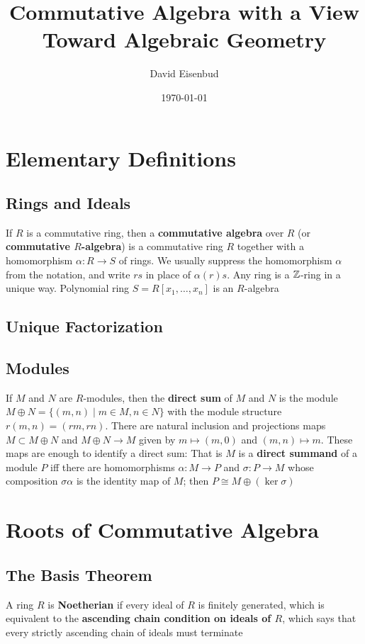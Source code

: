 \documentclass[11pt]{article}
\author{David Eisenbud}
\date{\today}
\title{Commutative Algebra with a View Toward Algebraic Geometry}
\begin{document}
\maketitle
\tableofcontents

\section{Elementary Definitions}
\label{sec:orgfbc8f1d}
\subsection{Rings and Ideals}
\label{sec:org9f207fe}
If \(R\) is a commutative ring, then a \textbf{commutative algebra} over \(R\) (or
\textbf{commutative \(R\)-algebra}) is a commutative ring \(R\) together with a
homomorphism \(\alpha:R\to S\) of rings. We usually suppress the homomorphism \(\alpha\)
from the notation, and write \(rs\) in place of \(\alpha(r)s\). Any ring is a
\(\mathbb{Z}\)-ring in a unique way. Polynomial ring \(S=R[x_1,\dots,x_n]\) is an \(R\)-algebra
\subsection{Unique Factorization}
\label{sec:orge49c9ca}
\subsection{Modules}
\label{sec:org9461403}
If \(M\) and \(N\) are \(R\)-modules, then the \textbf{direct sum} of \(M\) and \(N\)
is the module \(M\oplus N=\{(m,n)\mid m\in M,n\in N\}\) with the module
structure \(r(m,n)=(rm,rn)\). There are natural inclusion and projections
maps \(M\subset M\oplus N\) and \(M\oplus N\to M\) given by \(m\mapsto(m,0)\)
and \((m,n)\mapsto m\). These maps are enough to identify a direct sum: That
is \(M\) is a \textbf{direct summand} of a module \(P\) iff there are homomorphisms
\(\alpha:M\to P\) and \(\sigma:P\to M\) whose composition \(\sigma\alpha\) is the
identity map of \(M\); then \(P\cong M\oplus(\ker\sigma)\)
\section{Roots of Commutative Algebra}
\label{sec:org57f8d70}
\subsection{The Basis Theorem}
\label{sec:orgfb3f124}
A ring \(R\) is \textbf{Noetherian} if every ideal of \(R\) is finitely generated,
which is equivalent to the \textbf{ascending chain condition on ideals of \(R\)},
which says that every strictly ascending chain of ideals must terminate
\end{document}
